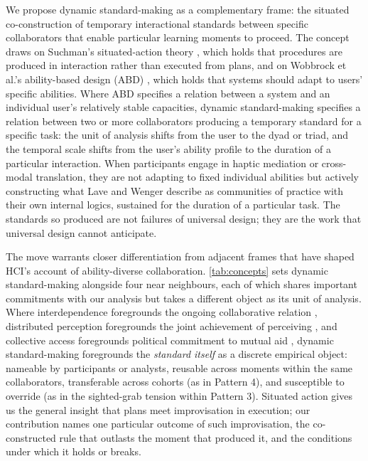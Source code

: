 We propose dynamic standard-making as a complementary frame: the situated co-construction of temporary interactional standards between specific collaborators that enable particular learning moments to proceed. The concept draws on Suchman's situated-action theory \cite{suchman_human-machine_2006}, which holds that procedures are produced in interaction rather than executed from plans, and on Wobbrock et al.'s ability-based design (ABD) \cite{wobbrock_ability-based_2011}, which holds that systems should adapt to users' specific abilities. Where ABD specifies a relation between a system and an individual user's relatively stable capacities, dynamic standard-making specifies a relation between two or more collaborators producing a temporary standard for a specific task: the unit of analysis shifts from the user to the dyad or triad, and the temporal scale shifts from the user's ability profile to the duration of a particular interaction. When participants engage in haptic mediation or cross-modal translation, they are not adapting to fixed individual abilities but actively constructing what Lave and Wenger describe as communities of practice \cite{lave_situated_1991} with their own internal logics, sustained for the duration of a particular task. The standards so produced are not failures of universal design; they are the work that universal design cannot anticipate.

The move warrants closer differentiation from adjacent frames that have shaped HCI's account of ability-diverse collaboration. \autoref{tab:concepts} sets dynamic standard-making alongside four near neighbours, each of which shares important commitments with our analysis but takes a different object as its unit of analysis. Where interdependence foregrounds the ongoing collaborative relation \cite{bennett_interdependence_2018}, distributed perception foregrounds the joint achievement of perceiving \cite{due_distributed_2021}, and collective access foregrounds political commitment to mutual aid \cite{mia_mingus_access_2017}, dynamic standard-making foregrounds the \textit{standard itself} as a discrete empirical object: nameable by participants or analysts, reusable across moments within the same collaborators, transferable across cohorts (as in Pattern 4), and susceptible to override (as in the sighted-grab tension within Pattern 3). Situated action \cite{suchman_human-machine_2006} gives us the general insight that plans meet improvisation in execution; our contribution names one particular outcome of such improvisation, the co-constructed rule that outlasts the moment that produced it, and the conditions under which it holds or breaks.

